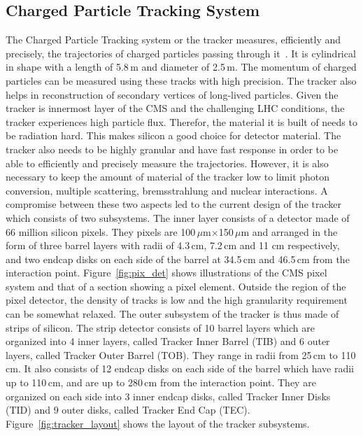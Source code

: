 \subsection{Charged Particle Tracking System}
\label{tracker}
The Charged Particle Tracking system or the tracker measures, efficiently and precisely, the trajectories of charged particles passing through it~\cite{cms_exp_ref, pix_det, pix_det2}. It is cylindrical in shape with a length of 5.8\,m and diameter of 2.5\,m. The momentum of charged particles can be measured using these tracks with high precision. The tracker also helps in reconstruction of secondary vertices of long-lived particles. Given the tracker is innermost layer of the CMS and the challenging LHC conditions, the tracker experiences high particle flux. Therefor, the material it is built of needs to be radiation hard. This makes silicon a good choice for detector material. The tracker also needs to be highly granular and have fast response in order to be able to efficiently and precisely measure the trajectories. However, it is also necessary to keep the amount of material of the tracker low to limit photon conversion, multiple scattering, bremsstrahlung and nuclear interactions. A compromise between these two aspects led to the current design of the tracker which consists of two subsystems. The inner layer consists of a detector made of 66 million silicon pixels. They pixels are 100\,$\mu$m$\times$150\,$\mu$m and arranged in the form of three barrel layers with radii of 4.3\,cm, 7.2\,cm and 11 cm respectively, and two endcap disks on each side of the barrel at 34.5\,cm and 46.5\,cm from the interaction point. Figure~\ref{fig:pix_det} shows illustrations of the CMS pixel system and that of a section showing a pixel element. Outside the region of the pixel detector, the density of tracks is low and the high granularity requirement can be somewhat relaxed. The outer subsystem of the tracker is thus made of strips of silicon. The strip detector consists of 10 barrel layers which are organized into 4 inner layers, called Tracker Inner Barrel (TIB) and 6 outer layers, called Tracker Outer Barrel (TOB). They range in radii from 25\,cm to 110\,cm. It also consists of 12 endcap disks on each side of the barrel which have radii up to 110\,cm, and are up to 280\,cm from the interaction point. They are organized on each side into 3 inner endcap disks, called Tracker Inner Disks (TID) and 9 outer disks, called Tracker End Cap (TEC). Figure~\ref{fig:tracker_layout} shows the layout of the tracker subsystems.    

